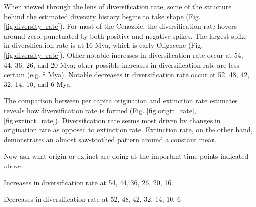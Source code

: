 \documentclass[12pt,letterpaper]{article}
\begin{document}
When viewed through the lens of diversification rate, some of the structure behind the estimated diversity history begins to take shape (Fig. \ref{fig:diversity_rate}). For most of the Cenozoic, the diversification rate hovers around zero, punctuated by both positive and negative spikes. The largest spike in diversification rate is at 16 Mya, which is early Oligocene (Fig. \ref{fig:diversity_rate}). Other notable increases in diversification rate occur at 54, 44, 36, 26, and 20 Mya; other possible increases in diversification rate are less certain (e.g. 8 Mya). Notable decreases in diversification rate occur at 52, 48, 42, 32, 14, 10, and 6 Mya. 

The comparison between per capita origination and extinction rate estimates reveals how diversification rate is formed (Fig. \ref{fig:origin_rate}, \ref{fig:extinct_rate}). Diversification rate seems most driven by changes in origination rate as opposed to extinction rate.
Extinction rate, on the other hand, demonstrates an almost saw-toothed pattern around a constant mean.

Now ask what origin or extinct are doing at the important time points indicated above.

Increases in diversification rate at 54, 44, 36, 26, 20, 16

Decreases in diversification rate at 52, 48, 42, 32, 14, 10, 6
\end{document}
